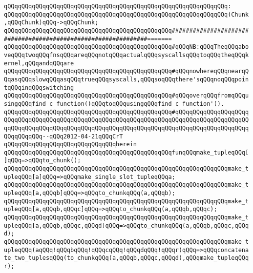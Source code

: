 \verb|qQQqqQQqqQQqqQQqqQQqqQQqqQQqqQQqqQQqqQQqqQQqqQQqqQQqqQQqqQQqqQQq:|\newline
\verb|qQQqqQQqqQQqqQQqqQQqqQQqqQQqqQQqqQQqqQQqqQQqqQQqqQQqqQQqqQQqqQQq(Chunk,qQQqChunk)qQQq->qQQqChunk;|\newline
\newline
\verb|qQQqqQQqqQQqqQQqqQQqqQQqqQQqqQQqqQQqqQQqqQQqqQQq###############################################################=======|\newline
\verb|qQQqqQQqqQQqqQQqqQQqqQQqqQQqqQQqqQQqqQQqqQQqqQQq#qQQqNB:qQQqTheqQQqaboveqQQqtwoqQQqfnsqQQqareqQQqnotqQQqactualqQQqsyscallsqQQqtoqQQqtheqQQqkernel,qQQqandqQQqare|\newline
\verb|qQQqqQQqqQQqqQQqqQQqqQQqqQQqqQQqqQQqqQQqqQQqqQQq#qQQqnowhereqQQqnearqQQqasqQQqslowqQQqasqQQqtrueqQQqsyscalls,qQQqsoqQQqthere'sqQQqnoqQQqpointqQQqinqQQqswitching|\newline
\verb|qQQqqQQqqQQqqQQqqQQqqQQqqQQqqQQqqQQqqQQqqQQqqQQq#qQQqoverqQQqfromqQQqusingqQQqfind_c_function()qQQqtoqQQqusingqQQqfind_c_function'().|\newline
\verb|qQQqqQQqqQQqqQQqqQQqqQQqqQQqqQQqqQQqqQQqqQQqqQQq#qQQqqQQqqQQqqQQqqQQqqQQqqQQqqQQqqQQqqQQqqQQqqQQqqQQqqQQqqQQqqQQqqQQqqQQqqQQqqQQqqQQqqQQqqQQqqQQqqQQqqQQqqQQqqQQqqQQqqQQqqQQqqQQqqQQqqQQqqQQqqQQqqQQqqQQqqQQqqQQqqQQqqQQqqQQq--qQQq2012-04-21qQQqCrT|\newline
\verb|qQQqqQQqqQQqqQQqqQQqqQQqqQQqqQQqherein|\newline
\verb|qQQqqQQqqQQqqQQqqQQqqQQqqQQqqQQqqQQqqQQqqQQqqQQqfunqQQqmake_tupleqQQq[]qQQq=>qQQqto_chunk();|\newline
\verb|qQQqqQQqqQQqqQQqqQQqqQQqqQQqqQQqqQQqqQQqqQQqqQQqqQQqqQQqqQQqqQQqmake_tupleqQQq[a]qQQq=>qQQqmake_single_slot_tupleqQQqa;|\newline
\verb|qQQqqQQqqQQqqQQqqQQqqQQqqQQqqQQqqQQqqQQqqQQqqQQqqQQqqQQqqQQqqQQqmake_tupleqQQq[a,qQQqb]qQQq=>qQQqto_chunkqQQq(a,qQQqb);|\newline
\verb|qQQqqQQqqQQqqQQqqQQqqQQqqQQqqQQqqQQqqQQqqQQqqQQqqQQqqQQqqQQqqQQqmake_tupleqQQq[a,qQQqb,qQQqc]qQQq=>qQQqto_chunkqQQq(a,qQQqb,qQQqc);|\newline
\verb|qQQqqQQqqQQqqQQqqQQqqQQqqQQqqQQqqQQqqQQqqQQqqQQqqQQqqQQqqQQqqQQqmake_tupleqQQq[a,qQQqb,qQQqc,qQQqd]qQQq=>qQQqto_chunkqQQq(a,qQQqb,qQQqc,qQQqd);|\newline
\verb|qQQqqQQqqQQqqQQqqQQqqQQqqQQqqQQqqQQqqQQqqQQqqQQqqQQqqQQqqQQqqQQqmake_tupleqQQq(aqQQq!qQQqbqQQq!qQQqcqQQq!qQQqdqQQq!qQQqr)qQQq=>qQQqconcatenate_two_tuplesqQQq(to_chunkqQQq(a,qQQqb,qQQqc,qQQqd),qQQqmake_tupleqQQqr);|\newline
